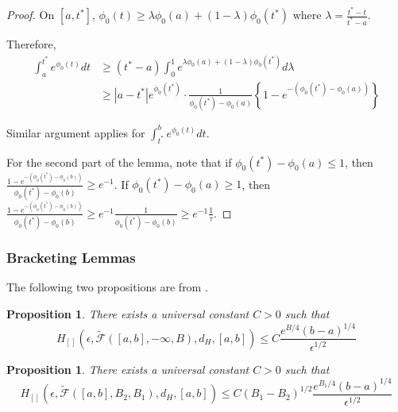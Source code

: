 \documentclass[12pt]{article}
\newtheorem{proposition}[theorem]{Proposition}
\begin{document}
\begin{proof}
  On $[a, t^*]$, $\phi_0(t) \geq \lambda \phi_0(a) + (1 - \lambda) \phi_0(t^*)$ where $\lambda = \frac{t^* - t}{t^* - a}$. 

  Therefore,
  \begin{align*}
    \int_a^{t^*} e^{\phi_0(t)} dt &\geq (t^* - a) \int_0^1 e^{ \lambda \phi_0(a) + (1 - \lambda) \phi_0(t^*)} d\lambda \\
                                  &\geq |a - t^*| e^{\phi_0(t^*)} \cdot \frac{1}{\phi_0(t^*) - \phi_0(a)} \left\{ 1 - e^{-(\phi_0(t^*) - \phi_0(a))} \right\}
  \end{align*}

  Similar argument applies for $\int_{t^*}^b e^{\phi_0(t)} dt$.

  For the second part of the lemma, note that if $\phi_0(t^*) - \phi_0(a) \leq 1$, then  $\frac{ 1 - e^{-(\phi_0(t^*) - \phi_0(b))}}{\phi_0(t^*) - \phi_0(b)} \geq e^{-1}$. If $\phi_0(t^*) - \phi_0(a) \geq 1$, then $\frac{ 1 - e^{-(\phi_0(t^*) - \phi_0(b))}}{\phi_0(t^*) - \phi_0(b)} \geq e^{-1} \frac{1}{\phi_0(t^*) - \phi_0(b)} \geq e^{-1} \frac{1}{\tau}$.
  
\end{proof}


\subsubsection{Bracketing Lemmas}

The following two propositions are from \citet{kim2016adaptation}.


\begin{proposition}
  \label{prop:segment_bracket1}
There exists a universal constant $C > 0$ such that 
\[
H_{[]}( \epsilon, \tilde{\mathcal{F}}([a,b],-\infty, B), d_H, [a,b]) \leq C \frac{ e^{B/4} (b-a)^{1/4}}{\epsilon^{1/2}} 
\]
\end{proposition}


\begin{proposition}
  \label{prop:segment_bracket2}
There exists a universal constant $C > 0$ such that 
\[
H_{[]}( \epsilon, \tilde{\mathcal{F}}([a,b],B_2,B_1), d_H, [a,b]) \leq C (B_1 - B_2)^{1/2} \frac{ e^{B_1/4} (b-a)^{1/4}}{\epsilon^{1/2}} 
\]
\end{proposition}





\end{document}

